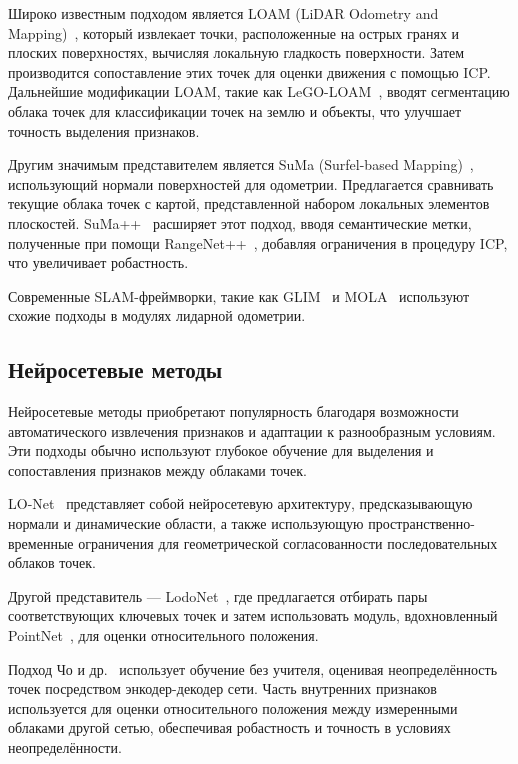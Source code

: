 Широко известным подходом является LOAM (LiDAR Odometry and \\Mapping)~\cite{zhang2014loam}, который 
извлекает точки, расположенные на острых гранях и плоских поверхностях, вычисляя 
локальную гладкость поверхности. Затем производится сопоставление этих точек для 
оценки движения с помощью ICP. Дальнейшие модификации LOAM, такие как LeGO-LOAM~\cite{shan2018lego}, вводят 
сегментацию облака точек для классификации точек на землю и объекты, что улучшает 
точность выделения признаков.

Другим значимым представителем является SuMa (Surfel-based Mapping)~\cite{behley2018efficient}, использующий нормали 
поверхностей для одометрии. Предлагается сравнивать текущие облака точек с картой, 
представленной набором локальных элементов плоскостей. SuMa++~\cite{chen2019suma++} расширяет этот подход, вводя 
семантические метки, полученные при помощи RangeNet++~\cite{milioto2019rangenet++}, добавляя 
ограничения в процедуру ICP, что увеличивает робастность.

Современные SLAM-фреймворки, такие как GLIM~\cite{koide2024glim} и MOLA~\cite{blanco2024flexible} 
используют схожие подходы в модулях лидарной одометрии.

\subsection{Нейросетевые методы}
Нейросетевые методы приобретают популярность благодаря возможности автоматического 
извлечения признаков и адаптации к разнообразным условиям. Эти подходы обычно 
используют глубокое обучение для выделения и сопоставления признаков между облаками точек.

LO-Net~\cite{li2019net} представляет собой нейросетевую архитектуру, предсказывающую нормали и 
динамические области, а также использующую пространственно-временные ограничения 
для геометрической согласованности последовательных облаков точек. 

Другой представитель --- LodoNet~\cite{zheng2020lodonet}, где предлагается отбирать пары соответствующих ключевых 
точек и затем использовать модуль, вдохновленный PointNet~\cite{qi2017pointnet}, для оценки относительного положения. 

Подход Чо и др.~\cite{cho2020unsupervised} использует обучение без учителя, оценивая 
неопределённость точек посредством энкодер-декодер сети. Часть внутренних признаков используется для оценки относительного положения между измеренными облаками другой сетью, обеспечивая 
робастность и точность в условиях неопределённости.


